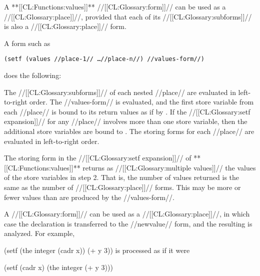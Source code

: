 \endlist
\endlist
 


\endsubsubsection%




A **[[CL:Functions:values]]** //[[CL:Glossary:form]]// can be used as a //[[CL:Glossary:place]]//,
provided that each of its //[[CL:Glossary:subforms]]// is also a //[[CL:Glossary:place]]// form.

A form such as

{\tt (setf (values //place-1// \dots //place-n//) //values-form//)}

does the following:

\beginlist
{} The //[[CL:Glossary:subforms]]// of each nested //place// are evaluated
in left-to-right order.
 The //values-form// is evaluated, and the first store
variable from each //place// is bound to its return values as if by 
.  
 If the //[[CL:Glossary:setf expansion]]// for any //place// 
involves more than one store variable, then the additional
store variables are bound to \nil.
 The storing forms for each //place// are evaluated in
left-to-right order.
\endlist

The storing form in the //[[CL:Glossary:setf expansion]]// of **[[CL:Functions:values]]**
returns as //[[CL:Glossary:multiple values]]// the values of the store
variables in step 2.  That is, the number of values returned is the
same as the number of //[[CL:Glossary:place]]// forms.  This may be more or fewer
values than are produced by the //values-form//.



\endsubsubsection%





A  //[[CL:Glossary:form]]// can be used as a //[[CL:Glossary:place]]//,
in which case the declaration is transferred to the //newvalue// form,
and the resulting  is analyzed.  For example,

\code
 (setf (the integer (cadr x)) (+ y 3))
\endcode
is processed as if it were

\code
 (setf (cadr x) (the integer (+ y 3)))
\endcode

\endsubsubsection%
     
